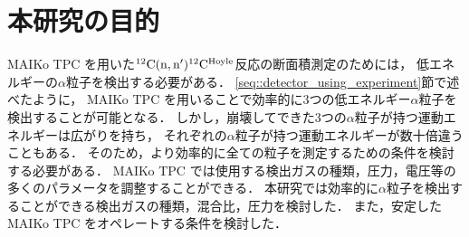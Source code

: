 \documentclass[../master]{subfiles}
\begin{document}

\section{本研究の目的}
MAIKo TPC を用いた${}^{12}{\rm C}({\rm n},{\rm n}'){}^{12}{\rm C}^{\rm Hoyle}$反応の断面積測定のためには，
低エネルギーの$\alpha$粒子を検出する必要がある．
\ref{seq::detector_using_experiment}節で述べたように，
MAIKo TPC を用いることで効率的に3つの低エネルギー$\alpha$粒子を検出することが可能となる．
しかし，崩壊してできた3つの$\alpha$粒子が持つ運動エネルギーは広がりを持ち，
それぞれの$\alpha$粒子が持つ運動エネルギーが数十倍違うこともある．
そのため，より効率的に全ての粒子を測定するための条件を検討する必要がある．
MAIKo TPC では使用する検出ガスの種類，圧力，電圧等の多くのパラメータを調整することができる．
本研究では効率的に$\alpha$粒子を検出することができる検出ガスの種類，混合比，圧力を検討した．
また，安定したMAIKo TPC をオペレートする条件を検討した．
\end{document}
